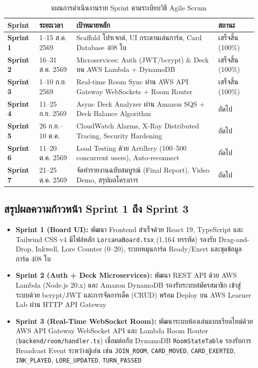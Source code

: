 \documentclass[12pt,a4paper]{article}
\begin{document}
\begin{table}[H]
\centering
\small
\begin{tabular}{p{2cm} p{2.8cm} p{7.5cm} p{2.2cm}}
\toprule
\textbf{Sprint} & \textbf{ระยะเวลา} & \textbf{เป้าหมายหลัก} & \textbf{สถานะ} \\
\midrule
\textbf{Sprint 1} & 1--15 ส.ค. 2569 & Scaffold โปรเจกต์, UI กระดานเล่นการ์ด, Card Database 408 ใบ & เสร็จสิ้น (100\%) \\
\textbf{Sprint 2} & 16--31 ส.ค. 2569 & Microservices: Auth (JWT/bcrypt) \& Deck บน AWS Lambda + DynamoDB & เสร็จสิ้น (100\%) \\
\textbf{Sprint 3} & 1--10 ก.ย. 2569 & Real-time Room Sync ผ่าน AWS API Gateway WebSockets + Room Router & เสร็จสิ้น (100\%) \\
\textbf{Sprint 4} & 11--25 ก.ย. 2569 & Async Deck Analyzer ผ่าน Amazon SQS + Deck Balance Algorithm & ถัดไป \\
\textbf{Sprint 5} & 26 ก.ย.--10 ต.ค. & CloudWatch Alarms, X-Ray Distributed Tracing, Security Hardening & ถัดไป \\
\textbf{Sprint 6} & 11--20 ต.ค. 2569 & Load Testing ด้วย Artillery (100--500 concurrent users), Auto-reconnect & ถัดไป \\
\textbf{Sprint 7} & 21--25 ต.ค. 2569 & จัดทำรายงานฉบับสมบูรณ์ (Final Report), Video Demo, สรุปผลโครงการ & ถัดไป \\
\bottomrule
\end{tabular}
\caption{แผนการดำเนินงานราย Sprint ตามระเบียบวิธี Agile Scrum}
\end{table}

\subsection{สรุปผลความก้าวหน้า Sprint 1 ถึง Sprint 3}
\begin{itemize}[leftmargin=1.5em, itemsep=3pt]
  \item \textbf{Sprint 1 (Board UI):} พัฒนา Frontend สำเร็จด้วย React 19, TypeScript และ Tailwind CSS v4 มีไฟล์หลัก \texttt{LorcanaBoard.tsx} (1,164 บรรทัด) รองรับ Drag-and-Drop, Inkwell, Lore Counter (0--20), ระบบหมุนการ์ด Ready/Exert และชุดข้อมูลการ์ด 408 ใบ
  \item \textbf{Sprint 2 (Auth + Deck Microservices):} พัฒนา REST API ด้วย AWS Lambda (Node.js 20.x) และ Amazon DynamoDB รองรับระบบสมัครสมาชิก เข้าสู่ระบบด้วย bcrypt/JWT และการจัดการเด็ค (CRUD) พร้อม Deploy บน AWS Learner Lab ผ่าน HTTP API Gateway
  \item \textbf{Sprint 3 (Real-Time WebSocket Room):} พัฒนาระบบห้องเล่นแบบเรียลไทม์ด้วย AWS API Gateway WebSocket API และ Lambda Room Router (\texttt{backend/room/handler.ts}) เชื่อมต่อกับ DynamoDB \texttt{RoomStateTable} รองรับการ Broadcast Event ระหว่างผู้เล่น เช่น \texttt{JOIN\_ROOM}, \texttt{CARD\_MOVED}, \texttt{CARD\_EXERTED}, \texttt{INK\_PLAYED}, \texttt{LORE\_UPDATED}, \texttt{TURN\_PASSED}
\end{itemize}
\end{document}
